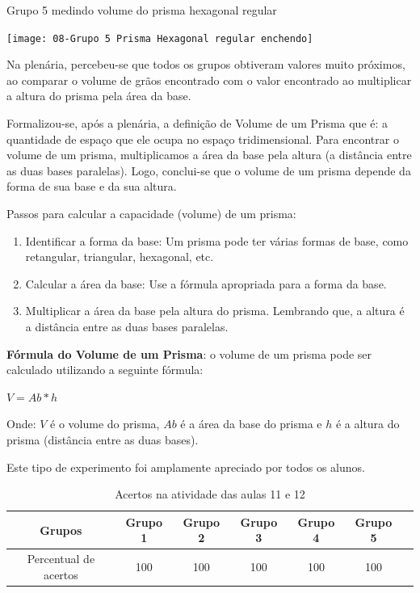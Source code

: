 \begin{CenteredFigure}
    \caption{Grupo 5 medindo volume do prisma hexagonal regular} \label{fig:8-medindo volume}
    \texttt{[image: 08-Grupo 5 Prisma Hexagonal regular enchendo]}
    \legend{\autoria}
\end{CenteredFigure}

Na plenária, percebeu-se que todos os grupos obtiveram valores muito próximos, ao comparar o volume de grãos encontrado com o valor encontrado ao multiplicar a altura do prisma pela área da base.

Formalizou-se, após a plenária, a definição de Volume de um Prisma que é: a quantidade de espaço que ele ocupa no espaço tridimensional. Para encontrar o volume de um prisma, multiplicamos a área da base pela altura (a distância entre as duas bases paralelas). Logo, conclui-se que o volume de um prisma depende da forma de sua base e da sua altura.

Passos para calcular a capacidade (volume) de um prisma:

\begin{enumerate}
    \item Identificar a forma da base: Um prisma pode ter várias formas de base, como retangular, triangular, hexagonal, etc.
    \item Calcular a área da base: Use a fórmula apropriada para a forma da base.
    \item Multiplicar a área da base pela altura do prisma. Lembrando que, a altura é a distância entre as duas bases paralelas.
\end{enumerate}

\textbf{Fórmula do Volume de um Prisma}: o volume de um prisma pode ser calculado utilizando a seguinte fórmula:

\textcolor[HTML]{0000FF}{$V = Ab * h$}

Onde: $V$ é o volume do prisma, $Ab$ é a área da base do prisma e $h$ é a altura do prisma (distância entre as duas bases).

Este tipo de experimento foi amplamente apreciado por todos os alunos.

\begin{table}[htbp] \centering
    \caption{Acertos na atividade das aulas 11 e 12} \label{tab:Acertos do Encontro 6}
    \begin{tabular}{|c|c|c|c|c|c|c|}
        \hline
        \textbf{Grupos}       & \textbf{Grupo 1} & \textbf{Grupo 2} & \textbf{Grupo 3} & \textbf{Grupo 4} & \textbf{Grupo 5} \\
        \hline
        Percentual de acertos & 100              & 100              & 100              & 100              & 100              \\
        \hline
    \end{tabular}
    \legend{\legendaTabela}
\end{table}

